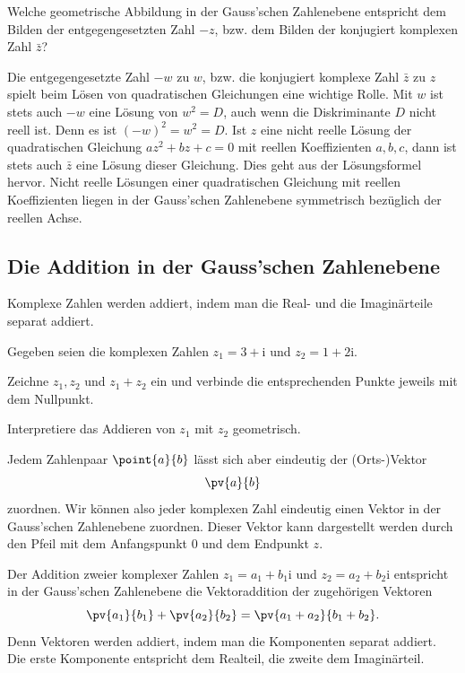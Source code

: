 \documentclass[%
11pt,%
twoside,%
titlepage,%
german,%
headsepline%
]{scrartcl}
\begin{document}
\begin{ueb}
Welche geometrische Abbildung in der Gauss'schen Zahlenebene entspricht dem Bilden der entgegengesetzten Zahl $-z$, bzw. dem Bilden der konjugiert komplexen Zahl $\bar{z}$?
\end{ueb}

\begin{bem}
Die entgegengesetzte Zahl $-w$ zu $w$, bzw. die konjugiert komplexe Zahl $\bar{z}$ zu $z$ spielt beim L\"osen von quadratischen Gleichungen eine wichtige Rolle. Mit $w$ ist stets auch $-w$ eine L\"osung von $w^2 = D$, auch wenn die Diskriminante $D$ nicht reell ist. Denn es ist $(-w)^2 = w^2 = D$. Ist $z$ eine nicht reelle L\"osung der quadratischen Gleichung $az^2 + bz + c = 0$ mit reellen Koeffizienten $a, b, c$, dann ist stets auch $\bar{z}$ eine L\"osung dieser Gleichung. Dies geht aus der L\"osungsformel hervor. Nicht reelle L\"osungen einer quadratischen Gleichung mit reellen Koeffizienten liegen in der Gauss'schen Zahlenebene symmetrisch bez\"uglich der reellen Achse.
\end{bem}

\subsection{Die Addition in der Gauss'schen Zahlenebene}

Komplexe Zahlen werden addiert, indem man die Real- und die Imaginärteile separat addiert.

\begin{ueb}
Gegeben seien die komplexen Zahlen $z_1=3+\mathrm{i}$ und $z_2=1+2\mathrm{i}$.
\begin{enumeratea}
\item Zeichne $z_1, z_2$ und $z_1+z_2$ ein und verbinde die entsprechenden Punkte jeweils mit dem Nullpunkt.
\item Interpretiere das Addieren von $z_1$ mit $z_2$ geometrisch.
\end{enumeratea}
\end{ueb}
\noindent Jedem Zahlenpaar $\point{a}{b}$ lässt sich aber eindeutig der (Orts-)Vektor
$$\pv{a}{b}$$
zuordnen. Wir k\"onnen also jeder komplexen Zahl eindeutig einen Vektor in der Gauss'\-schen Zahlenebene zuordnen. Dieser Vektor kann dargestellt werden durch den Pfeil mit dem Anfangspunkt $0$ und dem Endpunkt $z$.

Der Addition zweier komplexer Zahlen $z_1 = a_1 +b_1\mathrm{i}$ und $z_2 = a_2 +b_2\mathrm{i}$ entspricht in der Gauss'\-schen Zahlenebene die Vektoraddition der zugeh\"origen Vektoren
$$\pv{a_1}{b_1}+\pv{a_2}{b_2}=\pv{a_1+a_2}{b_1+b_2}.$$
Denn Vektoren werden addiert, indem man die Komponenten separat addiert. Die erste Komponente entspricht dem Realteil, die zweite dem Imaginärteil.
\end{document}
